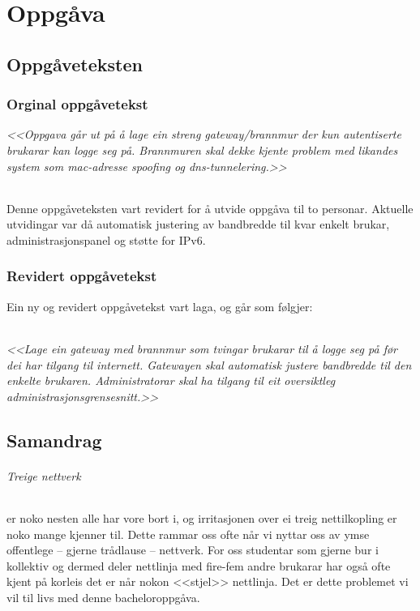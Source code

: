 \documentclass[nynorsk,12pt,a4paper,oneside]{book}
\begin{document}
\part{Oppgåva}

\chapter{Oppgåveteksten}

\section{Orginal oppgåvetekst}
\emph{<<Oppgava går ut på å lage ein streng gateway/brannmur der kun autentiserte brukarar kan logge seg på. Brannmuren skal dekke kjente problem med likandes system som mac-adresse spoofing og dns-tunnelering.>>}
\paragraph*{}
Denne oppgåveteksten vart revidert for å utvide oppgåva til to personar. Aktuelle utvidingar var då automatisk justering av bandbredde til kvar enkelt brukar, administrasjonspanel og støtte for IPv6.

\section{Revidert oppgåvetekst}
Ein ny og revidert oppgåvetekst vart laga, og går som følgjer:
\paragraph*{}
\emph{<<Lage ein gateway med brannmur som tvingar brukarar til å logge seg på før dei har tilgang til internett. Gatewayen skal automatisk justere bandbredde til den enkelte brukaren. Administratorar skal ha tilgang til eit oversiktleg administrasjonsgrensesnitt.>>}


\chapter{Samandrag}
\paragraph{Treige nettverk} er noko nesten alle har vore bort i, og irritasjonen over ei treig nettilkopling er noko mange kjenner til. Dette rammar oss ofte når vi nyttar oss av ymse offentlege -- gjerne trådlause -- nettverk. For oss studentar som gjerne bur i kollektiv og dermed deler nettlinja med fire-fem andre brukarar har også ofte kjent på korleis det er når nokon <<stjel>> nettlinja. Det er dette problemet vi vil til livs med denne bacheloroppgåva.
\end{document}

